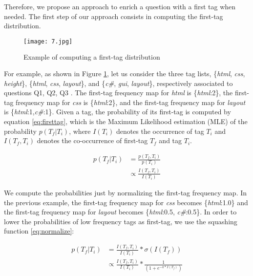 

Therefore, we propose an approach to enrich a question with a first tag when needed. The first step of our approach consists in computing the first-tag distribution.
\begin{figure}[htp]
\centering
\texttt{[image: 7.jpg]}  
\caption{Example of computing a first-tag distribution}
\label{fig:examplefirsttag} 
\end{figure}
For example, as shown in Figure \ref{fig:examplefirsttag}, let us consider the three tag lists, \{\textit{html}, \textit{css}, \textit{height}\},  \{\textit{html}, \textit{css}, \textit{layout}\}, and \{\textit{c\#}, \textit{gui}, \textit{layout}\}, respectively associated to questions Q1, Q2, Q3 . The first-tag frequency map for \textit{html} is \{\textit{html}:2\}, the first-tag frequency map for \textit{css} is \{\textit{html}:2\}, and the first-tag frequency map for \textit{layout} is \{\textit{html}:1,\textit{c\#}:1\}. Given a tag, the probability of its first-tag is computed by equation \ref{eq:firsttag}, which is the Maximum Likelihood estimation (MLE) of the probability $p(T_f|T_i)$, where $I(T_i)$ denotes the occurrence of tag $T_i$ and $I(T_f,T_i)$ denotes the co-occurrence of first-tag $T_f$ and tag $T_i$.

\begin{equation}
\begin{split}
p(T_f|T_i)  &=\frac{p(T_f,T_i) }{p(T_i)} \\
                  &\propto \frac{I(T_f,T_i)}{I(T_i)}
\label{eq:firsttag}
\end{split}
\end{equation}


We compute the probabilities just by normalizing the first-tag frequency map. In the previous example, the first-tag frequency map for \textit{css} becomes \{\textit{html}:1.0\} and the first-tag frequency map for \textit{layout} becomes \{\textit{html}:0.5, \textit{c\#}:0.5\}. In order to lower the probabilities of low frequency tags as first-tag, we use the squashing function \ref{eq:normalize}:


\begin{equation}
\begin{split}
p(T_f|T_i) &=\frac{I(T_f,T_i)}{I(T_i)}*\sigma(I(T_f)) \\
                  &\propto \frac{I(T_f,T_i)}{I(T_i)}*\frac{1}{(1+e^{-k*I(T_f)})}
\label{eq:normalize}
\end{split}
\end{equation}

